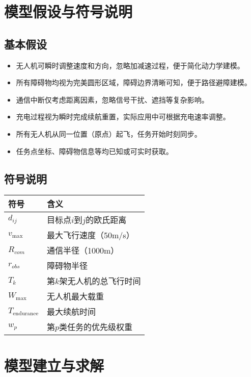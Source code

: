 \documentclass[12pt,fontset=adobe]{ctexart}
\begin{document}
\section{模型假设与符号说明}

\subsection{基本假设}
\begin{itemize}
  \item 无人机可瞬时调整速度和方向，忽略加减速过程，便于简化动力学建模。
  \item 所有障碍物均视为完美圆形区域，障碍边界清晰可知，便于路径避障建模。
  \item 通信中断仅考虑距离因素，忽略信号干扰、遮挡等复杂影响。
  \item 充电过程视为瞬时完成续航重置，实际应用中可根据充电速率调整。
  \item 所有无人机从同一位置（原点）起飞，任务开始时刻同步。
  \item 任务点坐标、障碍物信息等均已知或可实时获取。
\end{itemize}

\subsection{符号说明}
\begin{center}
  \begin{tabular}{ll}
    \hline
    符号 & 含义 \\
    \hline
    $d_{ij}$ & 目标点$i$到$j$的欧氏距离 \\
    $v_\text{max}$ & 最大飞行速度（50m/s） \\
    $R_{com}$ & 通信半径（1000m） \\
    $r_{obs}$ & 障碍物半径 \\
    $T_k$ & 第$k$架无人机的总飞行时间 \\
    $W_\text{max}$ & 无人机最大载重 \\
    $T_\text{endurance}$ & 最大续航时间 \\
    $w_p$ & 第$p$类任务的优先级权重 \\
    \hline
  \end{tabular}
\end{center}

\section{模型建立与求解}
\end{document}
